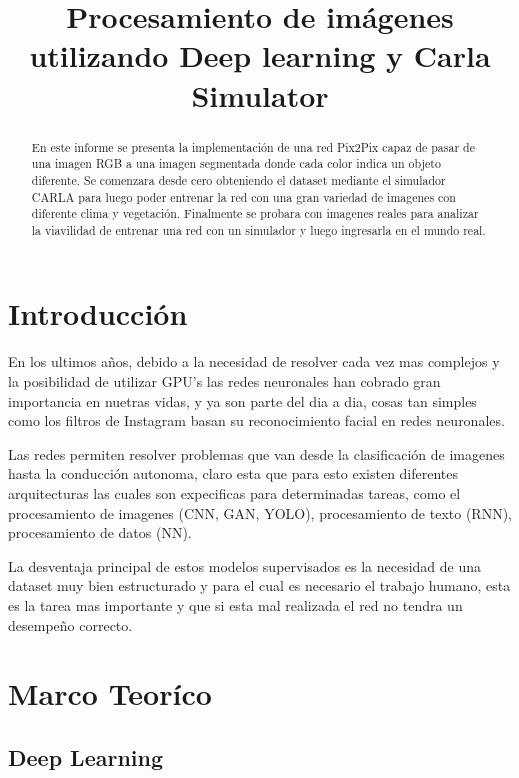 \documentclass[]{IEEEtran}
\title{Procesamiento de imágenes utilizando Deep learning y Carla 
Simulator}
\author{}
\date{}
\begin{document}
    \maketitle

    \begin{abstract}
        En este informe se presenta la implementación de una red Pix2Pix capaz de pasar de una imagen RGB a 
        una imagen segmentada donde cada color indica un objeto diferente. Se comenzara desde cero obteniendo el 
        dataset mediante el simulador CARLA para luego poder entrenar la red con una gran variedad de imagenes con 
        diferente clima y vegetación. Finalmente se probara con imagenes reales para analizar la viavilidad de entrenar una 
        red con un simulador y luego ingresarla en el mundo real.
    \end{abstract}

    \section{Introducción}

    En los ultimos años, debido a la necesidad de resolver cada vez mas complejos y la posibilidad de utilizar GPU's las redes neuronales han cobrado 
    gran importancia en nuetras vidas, y ya son parte del dia a dia, cosas tan simples como los filtros de Instagram basan 
    su reconocimiento facial en redes neuronales. 

    Las redes permiten resolver problemas que van desde la clasificación de imagenes hasta la conducción autonoma, claro esta 
    que para esto existen diferentes arquitecturas las cuales son expecificas para determinadas tareas, como el procesamiento de imagenes (CNN, GAN, YOLO), 
    procesamiento de texto (RNN), procesamiento de datos (NN).

    La desventaja principal de estos modelos supervisados es la necesidad de una dataset muy bien estructurado y para el cual es necesario 
    el trabajo humano, esta es la tarea mas importante y que si esta mal realizada el red no tendra un desempeño correcto.



    \section{Marco Teoríco}

    \subsection{Deep Learning}
\end{document}
